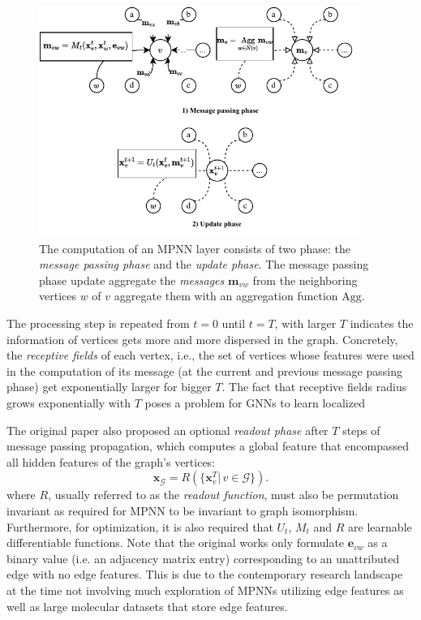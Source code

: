 \begin{figure}
  \begin{center}
    \includegraphics[width=0.95\textwidth]{figures/mpnn.pdf}
  \end{center}
  \caption{The computation of an MPNN layer consists of two phase: the
  \textit{message passing phase} and the \textit{update phase}. The
  message passing phase update aggregate the \textit{messages}
  $\mathbf{m}_{vw}$ from the neighboring vertices $w$ of $v$ aggregate them
  with an aggregation function $\text{Agg}$.}
  \label{fig:}
\end{figure}


The processing step is repeated from $t=0$ until $t=T$, with larger $T$ indicates the
information of vertices gets more and more dispersed in the graph. Concretely,
the \textit{receptive fields} of each vertex, i.e., the set of vertices whose
features were used in the computation of its message (at the current and
previous message passing phase) get exponentially larger for bigger $T$. The
fact that receptive fields radius grows exponentially with $T$ poses a problem
for GNNs to learn localized

The original paper also proposed an optional \textit{readout phase} after $T$ steps
of message passing propagation, which computes a global feature that encompassed all hidden
features of the graph's vertices:
$$
  \mathbf{x}_{\mathcal{G}} = R(\{\mathbf{x}_{v}^T |\, v \in \mathcal{G}\})
.$$
where $R$, usually referred to as the \textit{readout function}, must also be
permutation invariant as required for MPNN to be invariant to graph isomorphism.
Furthermore, for optimization, it is also required that $U_t$, $M_t$ and $R$ are
learnable differentiable functions. Note that the original works only
formulate $\mathbf{e}_{vw}$ as a binary value (i.e. an adjacency matrix entry)
corresponding to an unattributed edge with no edge features. This is due to the
contemporary research landscape at the time not involving much exploration of MPNNs
utilizing edge features as well as large molecular datasets that store edge
features.

